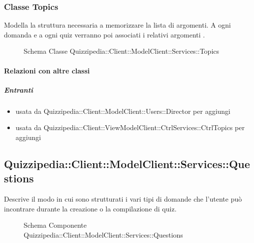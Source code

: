 \subsubsection{Classe Topics}
Modella la struttura necessaria a memorizzare la lista di argomenti. A ogni domanda e a ogni quiz verranno poi associati i relativi argomenti .
\begin{figure}[H]
\centering
\noindent{}
\caption[Schema Classe Topics]{Schema Classe Quizzipedia::Client::ModelClient::Services::Topics}
\end{figure}
\paragraph{Relazioni con altre classi}
\subparagraph{Entranti}
\begin{itemize}
\item usata da Quizzipedia::Client::ModelClient::Users::Director per aggiungi
\item usata da Quizzipedia::Client::ViewModelClient::CtrlServices::CtrlTopics per aggiungi
\end{itemize}
\subsection{Quizzipedia::Client::ModelClient::Services::Questions}
Descrive il modo in cui sono strutturati i vari tipi di domande che l'utente può incontrare durante la creazione o la compilazione di quiz.
\begin{figure}[H]
\centering
\noindent{}
\caption[Schema Componente Quizzipedia::Client::ModelClient::Services::Questions]{Schema Componente Quizzipedia::Client::ModelClient::Services::Questions}
\end{figure}
